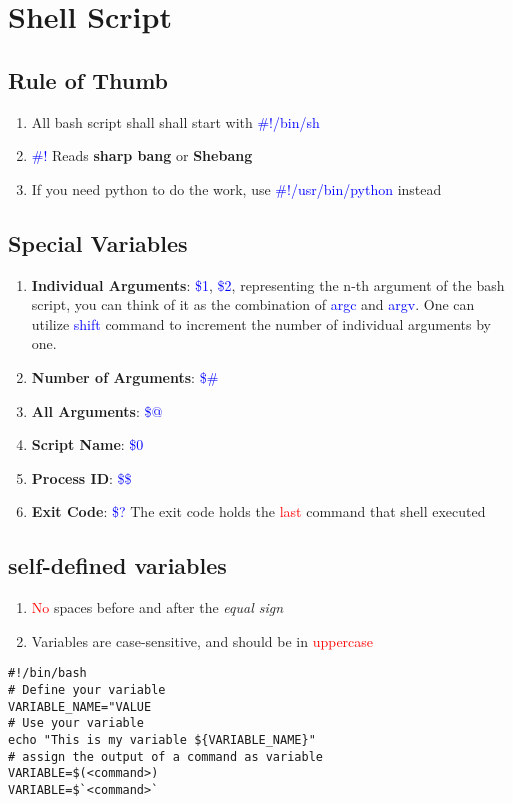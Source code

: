 \documentclass[12pt,a4paper]{article}
\newcommand{\rt}[1]{\textcolor{red}{#1}}
\newcommand{\bt}[1]{\textcolor{blue}{#1}}
\begin{document}
\section{Shell Script}
\subsection{Rule of Thumb}
\begin{enumerate}
	\item All bash script shall shall start with \bt{\#!/bin/sh}
	\item \bt{\#!} Reads \textbf{sharp bang} or \textbf{Shebang}
	\item If you need python to do the work, use \bt{\#!/usr/bin/python} instead
\end{enumerate}

\subsection{Special Variables}
\begin{enumerate}
	\item \textbf{Individual Arguments}: \bt{\$1}, \bt{\$2}, representing the n-th argument of the bash script, you can think of it as the combination of \bt{argc} and \bt{argv}. One can utilize \bt{shift} command to increment the number of individual arguments by one.
	\item \textbf{Number of Arguments}: \bt{\$\#}
	\item \textbf{All Arguments}: \bt{\$@}
	\item \textbf{Script Name}: \bt{\$0}
	\item \textbf{Process ID}: \bt{\$\$}
	\item \textbf{Exit Code}: \bt{\$?} The exit code holds the \rt{last} command that shell executed
\end{enumerate}

\subsection{self-defined variables}
\begin{enumerate}
	\item \rt{No} spaces before and after the \textit{equal sign}
	\item Variables are case-sensitive, and should be in \rt{uppercase}
\end{enumerate}
\begin{footnotesize}
\begin{verbatim}
#!/bin/bash
# Define your variable
VARIABLE_NAME="VALUE
# Use your variable
echo "This is my variable ${VARIABLE_NAME}"
# assign the output of a command as variable
VARIABLE=$(<command>)
VARIABLE=$`<command>`
\end{verbatim}
\end{footnotesize}
\end{document}
